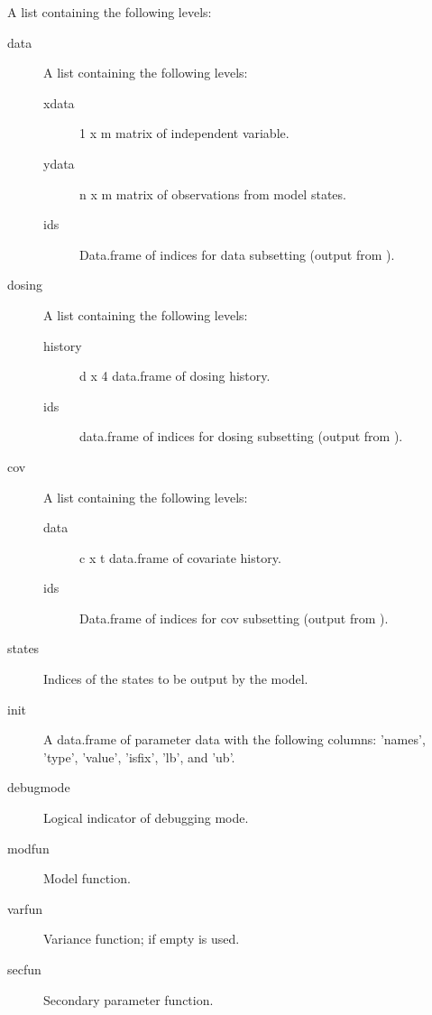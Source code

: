 \begin{Arguments}
\begin{ldescription}
\item[\code{problem}] A list containing the following levels:\begin{description}

\item[data] A list containing the following levels:\begin{description}

\item[xdata] 1 x m matrix of independent variable.
\item[ydata] n x m matrix of observations from model states.
\item[ids] Data.frame of indices for data subsetting (output
from ).

\end{description}

\item[dosing] A list containing the following levels:\begin{description}

\item[history] d x 4 data.frame of dosing history.
\item[ids] data.frame of indices for dosing subsetting
(output from ).

\end{description}

\item[cov] A list containing the following levels:\begin{description}

\item[data] c x t data.frame of covariate history.
\item[ids] Data.frame of indices for cov subsetting (output
from ).

\end{description}

\item[states] Indices of the states to be output by the model.
\item[init] A data.frame of parameter data with the following columns:
'names', 'type', 'value', 'isfix', 'lb', and 'ub'.
\item[debugmode] Logical indicator of debugging mode.
\item[modfun] Model function.
\item[varfun] Variance function; if empty  is
used.
\item[secfun] Secondary parameter function.


\end{description}
\end{ldescription}
\end{Arguments}
